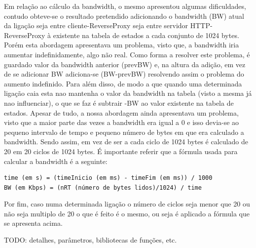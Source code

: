 \documentclass{article}
\begin{document}
Em relação ao cálculo da bandwidth, o mesmo apresentou algumas dificuldades, contudo obteve-se o resultado pretendido adicionando o bandwidth (BW) atual da ligação seja entre cliente-ReverseProxy seja entre servidor HTTP-ReverseProxy à existente na tabela de estados a cada conjunto de 1024 bytes. Porém esta abordagem apresentava um problema, visto que, a bandwidth iria aumentar indefinidamente, algo não real. Como forma a resolver este problema, é guardado valor da bandwidth anterior (prevBW) e, na altura da adição, em vez de se adicionar BW adiciona-se (BW-prevBW) resolvendo assim o problema do aumento indefinido. Para além disso, de modo a que quando uma determinada ligação caia esta nao mantenha o valor da bandwidth na tabela (visto a mesma já nao influenciar), o que se faz é subtrair -BW ao valor existente na tabela de estados. Apesar de tudo, a nossa abordagem ainda apresentava um problema, visto que a maior parte das vezes a bandwidth era igual a 0 e isso devia-se ao pequeno intervalo de tempo e pequeno número de bytes em que era calculado a bandwidth. Sendo assim, em vez de ser a cada ciclo de 1024 bytes é calculado de 20 em 20 ciclos de 1024 bytes. É importante referir que a fórmula usada para calcular a bandwidth é a seguinte:
\begin{verbatim}
time (em s) = (timeInicio (em ms) - timeFim (em ms)) / 1000
BW (em Kbps) = (nRT (número de bytes lidos)/1024) / time
\end{verbatim}
Por fim, caso numa determinada ligação o número de ciclos seja menor que 20 ou não seja multiplo de 20 o que é feito é o mesmo, ou seja é aplicado a fórmula que se apresenta acima.
\newline

{\color{red}TODO: detalhes, parâmetros, bibliotecas de funções, etc.}
\end{document}

